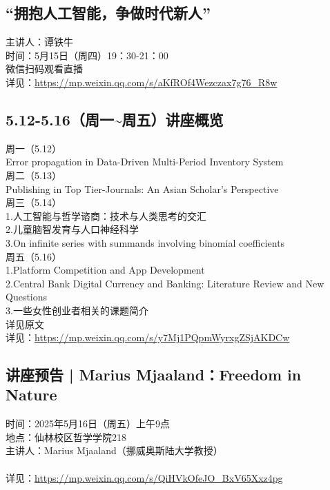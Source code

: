 \documentclass[letterpaper, 12pt]{article}
\begin{document}
\begin{multicols}{2}
\subsection{“拥抱人工智能，争做时代新人”} %
主讲人：谭铁牛
\\时间：5月15日（周四）19：30-21：00
\\微信扫码观看直播
\\详见：\url{https://mp.weixin.qq.com/s/aKfROf4Wezczax7g76_R8w}

\subsection{5.12-5.16（周一\textasciitilde{}周五）讲座概览} %
周一（5.12）
\\Error propagation in Data-Driven Multi-Period Inventory System
\\周二（5.13）
\\Publishing in Top Tier-Journals: An Asian Scholar’s Perspective
\\周三（5.14）
\\1.人工智能与哲学谘商：技术与人类思考的交汇
\\2.儿童脑智发育与人口神经科学
\\3.On infinite series with summands involving binomial coefficients
\\周五（5.16）
\\1.Platform Competition and App Development
\\2.Central Bank Digital Currency and Banking: Literature Review and New Questions
\\3.一些女性创业者相关的课题简介
\\详见原文
\\详见：\url{https://mp.weixin.qq.com/s/y7Mj1PQpmWyrxgZSjAKDCw}

\subsection{讲座预告 | Marius Mjaaland：Freedom in Nature} %
时间：2025年5月16日（周五）上午9点
\\地点：仙林校区哲学学院218
\\主讲人：Marius Mjaaland（挪威奥斯陆大学教授）
\\
\\详见：\url{https://mp.weixin.qq.com/s/QiHVkOfeJO_BxV65Xxz4pg}


    

\end{multicols}
\end{document}
